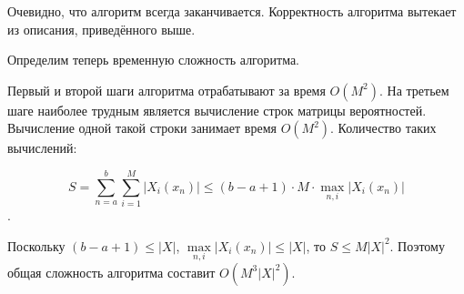 \par Очевидно, что алгоритм всегда заканчивается. Корректность алгоритма вытекает из описания, приведённого выше.
\par Определим теперь временную сложность алгоритма.
\par Первый и второй шаги алгоритма отрабатывают за время $O(M^2)$. На третьем шаге наиболее трудным является вычисление строк матрицы вероятностей. Вычисление одной такой строки занимает время $O(M^2)$. Количество таких вычислений: 

\[ S = \sum\limits_{n = a}^{b} \sum\limits_{i = 1}^{M} |X_i(x_n)| \le (b - a + 1) \cdot M \cdot \max\limits_{n, i} |X_i(x_n)|\]. 

Поскольку $(b - a + 1) \le |X|$, $\max\limits_{n, i} |X_i(x_n)| \le |X|$, то $S \le M |X|^2$. Поэтому общая сложность алгоритма составит $O(M^3 |X|^2)$.

